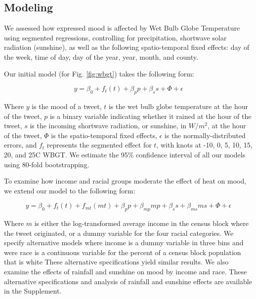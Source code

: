 \documentclass[fleqn,10pt]{wlscirep}
\begin{document}
\subsection*{Modeling}
We assessed how expressed mood is affected by Wet Bulb Globe Temperature using segmented regressions, controlling for precipitation, shortwave solar radiation (sunshine), as well as the following spatio-temporal fixed effects: day of the week, time of day, day of the year, year, month, and county. 

Our initial model (for Fig. \ref{fig:wbgt}) takes the following form:

\begin{equation}
 y = \beta_0 + f_t(t) + \beta_p p + \beta_s s + \Phi + \epsilon
 \label{mod:1}
\end{equation}

Where $y$ is the mood of a tweet, $t$ is the wet bulb globe temperature at the hour of the tweet, $p$ is a binary variable indicating whether it rained at the hour of the tweet, $s$ is the incoming shortwave radiation, or sunshine, in $W/m^2$, at the hour of the tweet, $\Phi$ is the spatio-temporal fixed effects, $\epsilon$ is the normally-distributed errors, and $f_t$ represents the segmented effect for $t$, with knots at -10\textdegree, 0\textdegree, 5\textdegree, 10\textdegree, 15\textdegree, 20\textdegree, and 25\textdegree C WBGT. We estimate the 95\% confidence interval of all our models using 80-fold bootstrapping. 

To examine how income and racial groups moderate the effect of heat on mood, we extend our model to the following form:

\begin{equation}
 y = \beta_0 + f_t(t) + f_{mt}(m t) + \beta_p p + \beta_{mp} m p + \beta_s s + \beta_{ms} m s + \Phi + \epsilon
 \label{mod:2}
\end{equation}

Where $m$ is either the log-transformed average income in the census block where the tweet originated, or a dummy variable for the four racial categories. We specify alternative models where income is a dummy variable in three bins and were race is a continuous variable for the percent of a census block population that is white These alternative specifications yield similar results. We also examine the effects of rainfall and sunshine on mood by income and race. These alternative specifications and analysis of rainfall and sunshine effects are available in the Supplement.
\end{document}

